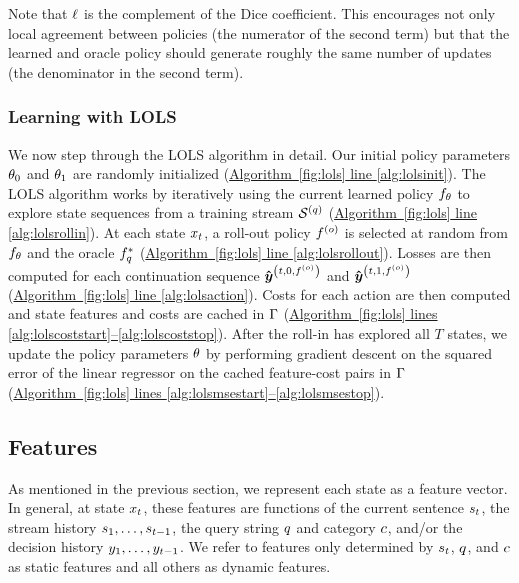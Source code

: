 Note that $\ell$ is the complement of the Dice coefficient.  This
encourages not only local agreement between policies (the numerator of the
second term) but that the learned and oracle policy should generate roughly the
same number of updates (the denominator in the second term).



\subsubsection{Learning with LOLS}

We now step through the LOLS algorithm in detail.  Our initial policy
parameters $\theta_0$ and $\theta_1$ are randomly initialized
(\hyperref[fig:lols]{Algorithm~\ref{fig:lols} line \ref{alg:lolsinit}}).  The
LOLS algorithm works by iteratively using the current learned policy
$f_{\theta}$ to explore state sequences from a training stream
$\mathcal{S}^{(q)}$ (\hyperref[fig:lols]{Algorithm~\ref{fig:lols} line
\ref{alg:lolsrollin}}).  At each state $x_t$, a roll-out policy
$f^{(o)}$ is selected at random from $f_{\theta}$ and the oracle
$f^*_{q}$ (\hyperref[fig:lols]{Algorithm~\ref{fig:lols} line
\ref{alg:lolsrollout}}).  Losses are then computed for each continuation
sequence $\boldsymbol{\hat{\boldsymbol{y}}}^{\left(t,0,f^{(o)}\right)}$ and $\boldsymbol{\hat{\boldsymbol{y}}}^{\left(t,1,f^{(o)}\right)}$
(\hyperref[fig:lols]{Algorithm~\ref{fig:lols} line \ref{alg:lolsaction}}).
Costs for each action are then computed and state features and costs are cached
in $\Gamma$ (\hyperref[fig:lols]{Algorithm~\ref{fig:lols} lines
\ref{alg:lolscoststart}--\ref{alg:lolscoststop}}).  After the roll-in has
explored all $T$ states, we update the policy parameters $\theta$ by
performing gradient descent on the squared error of the linear regressor on the
cached feature-cost pairs in $\Gamma$
(\hyperref[fig:lols]{Algorithm~\ref{fig:lols} lines
\ref{alg:lolsmsestart}--\ref{alg:lolsmsestop}}).

\subsection{Features}

As mentioned in the previous section, we represent each state as a feature
vector.  In general, at state $x_t$, these features are functions of the
current sentence $s_t$, the  stream history $s_1, \ldots,
s_{t-1}$, the query string $q$ and category $c$, and/or the
decision history $y_1,\ldots,y_{t-1}$.  We refer to features only
determined by $s_t$,  $q$, and $c$ as static features and all
others as dynamic features. 

